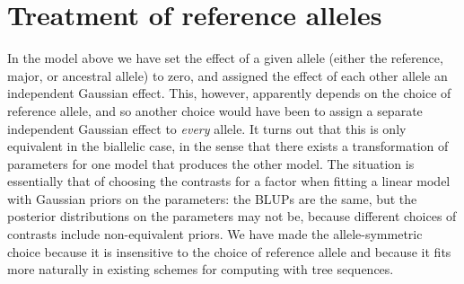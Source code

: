 
\section{Treatment of reference alleles}
\label{sec:reference_alleles}

In the model above we have set the effect of a given allele
(either the reference, major, or ancestral allele) to zero,
and assigned the effect of each other allele an independent Gaussian effect.
This, however, apparently depends on the choice of reference allele,
and so another choice would have been
to assign a separate independent Gaussian effect to \emph{every} allele.
It turns out that this is only equivalent in the biallelic case,
in the sense that there exists a transformation of parameters for one model
that produces the other model.
The situation is essentially that of choosing the contrasts for a factor
when fitting a linear model with Gaussian priors on the parameters:
the BLUPs are the same, but the posterior distributions on the parameters may not be,
because different choices of contrasts include non-equivalent priors.
We have made the allele-symmetric choice
because it is insensitive to the choice of reference allele
and because it fits more naturally in existing schemes for computing with tree sequences.

